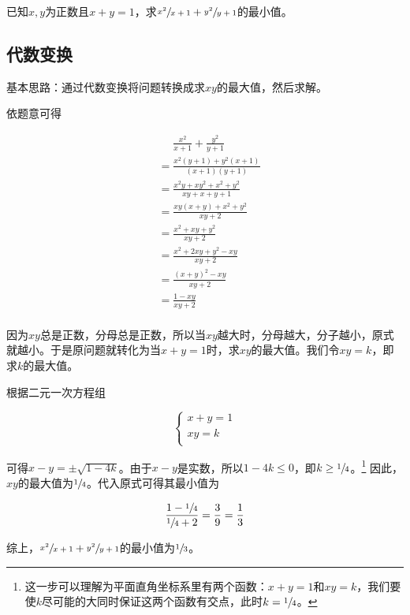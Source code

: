 

已知$x, y$为正数且$x + y = 1$，求$\sfrac{x^2}{x + 1} + \sfrac{y^2}{y + 1}$的最小值。


\subsection{代数变换} \label{subsec:0014-alg}

基本思路：通过代数变换将问题转换成求$xy$的最大值，然后求解。

依题意可得

\begin{align*}
  &\mathrel{\phantom{=}} \frac{x^2}{x + 1} + \frac{y^2}{y + 1} \\
  &= \frac{x^2(y + 1) + y^2(x + 1)}{(x + 1)(y + 1)} \\
  &= \frac{x^2y + xy^2 + x^2 + y^2}{xy + x + y + 1} \\
  &= \frac{xy(x + y) + x^2 + y^2}{xy + 2} \\
  &= \frac{x^2 + xy + y^2}{xy + 2} \\
  &= \frac{x^2 + 2xy + y^2 - xy}{xy + 2} \\
  &= \frac{(x + y)^2 - xy}{xy + 2} \\
  &= \frac{1 - xy}{xy + 2} \\
\end{align*}

因为$xy$总是正数，分母总是正数，所以当$xy$越大时，分母越大，分子越小，原式就越小。于是原问题就转化为当$x + y = 1$时，求$xy$的最大值。我们令$xy = k$，即求$k$的最大值。

根据二元一次方程组

\[ \begin{cases}
  x + y = 1 \\
  xy = k \\
\end{cases} \]

可得$x - y = \pm\sqrt{1 - 4k}$。由于$x - y$是实数，所以$1 - 4k \le 0$，即$k \ge \sfrac14$。\footnote{这一步可以理解为平面直角坐标系里有两个函数：$x + y = 1$和$xy = k$，我们要使$k$尽可能的大同时保证这两个函数有交点，此时$k = \sfrac14$。} 因此，$xy$的最大值为$\sfrac14$。代入原式可得其最小值为

\[ \frac{1 - \sfrac14}{\sfrac14 + 2} = \frac39 = \frac13 \]

综上，$\sfrac{x^2}{x + 1} + \sfrac{y^2}{y + 1}$的最小值为$\sfrac13$。

